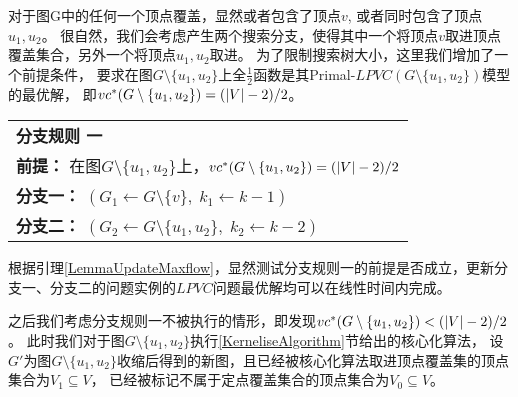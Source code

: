 对于图G中的任何一个顶点覆盖，显然或者包含了顶点$v$, 或者同时包含了顶点$u_1, u_2$。
很自然，我们会考虑产生两个搜索分支，使得其中一个将顶点$v$取进顶点覆盖集合，另外一个将顶点$u_1, u_2$取进。
为了限制搜索树大小，这里我们增加了一个前提条件，
要求在图$G \setminus \{u_1, u_2\}$上全$\frac{1}{2}$函数是其Primal-$LPVC(G \setminus \{u_1, u_2\})$模型的最优解，
即$vc^*(G \setminus \{u_1, u_2\}) = (\left\vert V \right\vert - 2) / 2$。\\

\begin{tabular}{ p{0.9\headwidth} }
  \hline
  \textbf{分支规则 一 }\\
  \textbf{前提：}  在图$G \setminus \{u_1, u_2\}$上，$vc^*(G \setminus \{u_1, u_2\}) = (\left\vert V \right\vert - 2) / 2$\\
  \textbf{分支一：} $(G_1 \leftarrow G \setminus \{v\},\; k_1 \leftarrow k - 1)$\\
  \textbf{分支二：} $(G_2 \leftarrow G \setminus \{u_1, u_2\},\; k_2 \leftarrow k - 2)$\\
  \hline
\end{tabular} \vspace{0.5cm}

根据引理\ref{LemmaUpdateMaxflow}，显然测试分支规则一的前提是否成立，更新分支一、分支二的问题实例的$LPVC$问题最优解均可以在线性时间内完成。

之后我们考虑分支规则一不被执行的情形，即发现$vc^*(G \setminus \{u_1, u_2\}) < (\left\vert V \right\vert - 2) / 2$。
此时我们对于图$G \setminus \{u_1, u_2\}$执行\ref{KerneliseAlgorithm}节给出的核心化算法，
设$G'$为图$G\setminus\{u_1, u_2\}$收缩后得到的新图，且已经被核心化算法取进顶点覆盖集的顶点集合为$V_1 \subseteq V$，
已经被标记不属于定点覆盖集合的顶点集合为$V_0 \subseteq V$。


